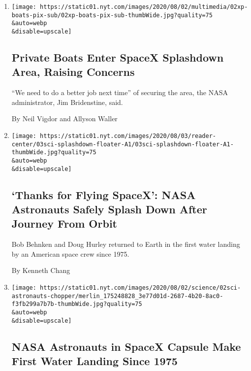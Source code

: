 \begin{enumerate}
\def\labelenumi{\arabic{enumi}.}
\item
  \href{/2020/08/02/us/flag-boat-SpaceX.html}{}

  \texttt{[image: https://static01.nyt.com/images/2020/08/02/multimedia/02xp-boats-pix-sub/02xp-boats-pix-sub-thumbWide.jpg?quality=75\\\&auto=webp\\\&disable=upscale]}

  \hypertarget{private-boats-enter-spacex-splashdown-area-raising-concerns}{%
  \subsection{Private Boats Enter SpaceX Splashdown Area, Raising
  Concerns}\label{private-boats-enter-spacex-splashdown-area-raising-concerns}}

  ``We need to do a better job next time'' of securing the area, the
  NASA administrator, Jim Bridenstine, said.

  By Neil Vigdor and Allyson Waller
\item
  \href{/2020/08/02/science/spacex-astronauts-splashdown.html}{}

  \texttt{[image: https://static01.nyt.com/images/2020/08/03/reader-center/03sci-splashdown-floater-A1/03sci-splashdown-floater-A1-thumbWide.jpg?quality=75\\\&auto=webp\\\&disable=upscale]}

  \hypertarget{thanks-for-flying-spacex-nasa-astronauts-safely-splash-down-after-journey-from-orbit}{%
  \subsection{`Thanks for Flying SpaceX': NASA Astronauts Safely Splash
  Down After Journey From
  Orbit}\label{thanks-for-flying-spacex-nasa-astronauts-safely-splash-down-after-journey-from-orbit}}

  Bob Behnken and Doug Hurley returned to Earth in the first water
  landing by an American space crew since 1975.

  By Kenneth Chang
\item
  \href{/2020/08/02/science/spacex-nasa-return.html}{}

  \texttt{[image: https://static01.nyt.com/images/2020/08/02/science/02sci-astronauts-chopper/merlin\_175248828\_3e77d01d-2687-4b20-8ac0-f3fb299a7b7b-thumbWide.jpg?quality=75\\\&auto=webp\\\&disable=upscale]}

  \hypertarget{nasa-astronauts-in-spacex-capsule-make-first-water-landing-since-1975}{%
  \subsection{NASA Astronauts in SpaceX Capsule Make First Water Landing
  Since
  1975}\label{nasa-astronauts-in-spacex-capsule-make-first-water-landing-since-1975}}


\end{enumerate}
